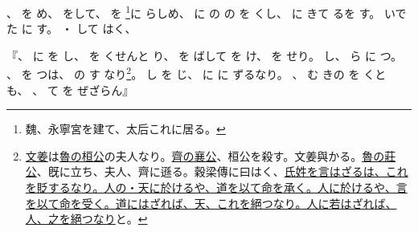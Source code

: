 \documentclass[a4paper,12pt]{article}
\begin{document}
%
、%
を%
め、%
%
をして、%
を%
\footnote{魏、永寧宮を建て、太后これに居る。}に%
らしめ、%
に%
の%
%
%
の%
を%
くし、%
に%
きて%
るを%
す。%
いで%
た%
に%
す。%
・%
して%
はく、%
\begin{quoting}
『、%
に%
を%
し、%
を%
くせんと%
り、%
を%
ばして%
を%
け、%
を%
せり。%
%
%
し、%
ら%
に%
つ。%
、%
を%
つは、%
の%
す%
なり\footnote{\href{https://ja.wikipedia.org/wiki/\%E6\%96\%87\%E5\%A7\%9C}{文姜}は\href{https://ja.wikipedia.org/wiki/\%E6\%A1\%93\%E5\%85\%AC_(\%E9\%AD\%AF)}{魯の桓公}の夫人なり。\href{https://ja.wikipedia.org/wiki/\%E8\%A5\%84\%E5\%85\%AC_(\%E6\%96\%89)}{齊の襄公}、桓公を殺す。文姜與かる。\href{https://ja.wikipedia.org/wiki/\%E8\%8D\%98\%E5\%85\%AC_(\%E9\%AD\%AF)}{魯の莊公}、旣に立ち、夫人、齊に遜る。穀梁傳に曰はく、\href{https://ctext.org/guliang-zhuan/zhuang-gong-yuan-nian/zh?searchu=\%E4\%B8\%8D\%E8\%A8\%80\%E6\%B0\%8F\%E5\%A7\%93\%EF\%BC\%8C\%E8\%B2\%B6\%E4\%B9\%8B\%E4\%B9\%9F\%E3\%80\%82\%E4\%BA\%BA\%E4\%B9\%8B\%E6\%96\%BC\%E5\%A4\%A9\%E4\%B9\%9F\%EF\%BC\%8C\%E4\%BB\%A5\%E9\%81\%93\%E5\%8F\%97\%E5\%91\%BD\%EF\%BC\%9B\%E6\%96\%BC\%E4\%BA\%BA\%E4\%B9\%9F\%EF\%BC\%8C\%E4\%BB\%A5\%E8\%A8\%80\%E5\%8F\%97\%E5\%91\%BD\%E3\%80\%82\%E4\%B8\%8D\%E8\%8B\%A5\%E6\%96\%BC\%E9\%81\%93\%E8\%80\%85\%EF\%BC\%8C\%E5\%A4\%A9\%E7\%B5\%95\%E4\%B9\%8B\%E4\%B9\%9F\%E3\%80\%82\%E4\%B8\%8D\%E8\%8B\%A5\%E6\%96\%BC\%E8\%A8\%80\%E8\%80\%85\%EF\%BC\%8C\%E4\%BA\%BA\%E7\%B5\%95\%E4\%B9\%8B\%E4\%B9\%9F\%E3\%80\%82&searchmode=showall\#result}{氏姓を言はざるは、これを貶するなり。人の・天に於けるや、道を以て命を承く。人に於けるや、言を以て命を受く。道にはざれば、天、これを絕つなり。人に若はざれば、人、之を絕つなり}と。}。%
し%
を%
じ、%
に%
に%
ずるなり。%
、%
む%
きの%
を%
くと%
も、%
、%
て%
を%
ぜざらん』
\end{quoting}
\end{document}
